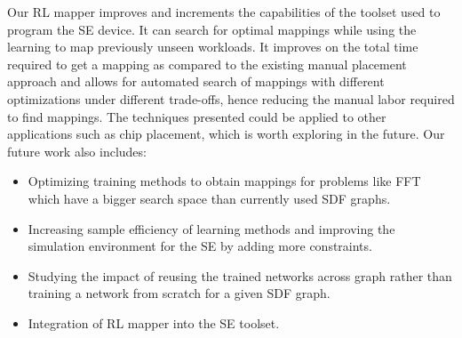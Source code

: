 Our RL mapper improves and increments the capabilities of the toolset used to program the SE device. 
It can search for optimal mappings while using the learning to map previously unseen workloads. 
It improves on the total time required to get a mapping as compared to the existing manual placement approach and allows for automated search of mappings with different optimizations under different trade-offs, hence reducing the manual labor required to find mappings. 
The techniques presented could be applied to other applications such as chip placement, which is worth exploring in the future. 
Our future work also includes: 
\begin{itemize}
    \item Optimizing training methods to obtain mappings for problems like FFT which have a bigger search space than currently used SDF graphs. 
    \item Increasing sample efficiency of learning methods and improving the simulation environment for the SE by adding more constraints. 
    \item Studying the impact of reusing the trained networks across graph rather than training a network from scratch for a given SDF graph.
    \item Integration of RL mapper into the SE toolset.
\end{itemize}